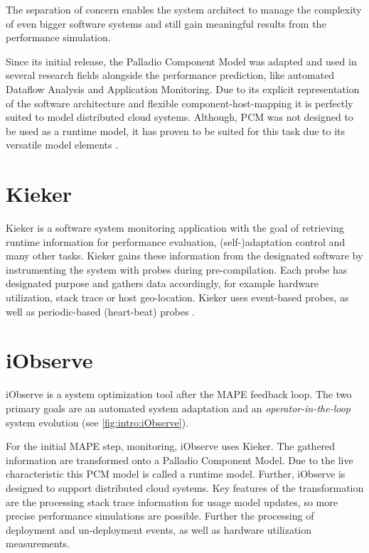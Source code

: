 The separation of concern enables the system architect to manage the complexity of even bigger software systems and still gain meaningful results from the performance simulation.

Since its initial release, the Palladio Component Model was adapted and used in several research fields alongside the performance prediction, like automated Dataflow Analysis and Application Monitoring. Due to its explicit representation of the software architecture and flexible component-host-mapping it is perfectly suited to model distributed cloud systems. Although, PCM was not designed to be used as a runtime model, it has proven to be suited for this task due to its versatile model elements \cite{Becker.2009}.

\section{Kieker}
\label{sec:Foundations:Kieker}

Kieker is a software system monitoring application with the goal of retrieving runtime information for performance evaluation, (self-)adaptation control and many other tasks. Kieker gains these information from the designated software by instrumenting the system with probes during pre-compilation. Each probe has designated purpose and gathers data accordingly, for example hardware utilization, stack trace or host geo-location. Kieker uses event-based probes, as well as periodic-based (heart-beat) probes \cite{kieker.web}.


\section{iObserve}
\label{sec:Foundations:iobserve}

iObserve is a system optimization tool after the MAPE feedback loop. The two primary goals are an automated system adaptation and an \textit{operator-in-the-loop} system evolution (see \autoref{fig:intro:iObserve}).

For the initial MAPE step, monitoring, iObserve uses Kieker. The gathered information are transformed onto a Palladio Component Model. Due to the live characteristic this PCM model is called a runtime model. Further, iObserve is designed to support distributed cloud systems. Key features of the transformation are the processing stack trace information for usage model updates, so more precise performance simulations are possible. Further the processing of deployment and un-deployment events, as well as hardware utilization  measurements.

